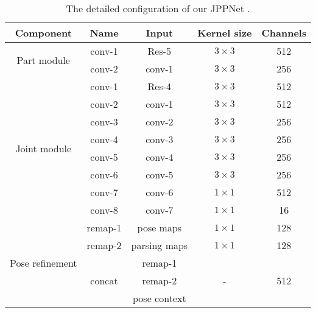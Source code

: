 \documentclass[10pt,journal,compsoc]{IEEEtran}
\begin{document}
\begin{table}[t]
\centering
\scriptsize
\tabcolsep 0.06in 
\caption{The detailed configuration of our JPPNet .}
\vspace{-3mm}
\label{tab: configuration}
\begin{tabular}{ccccc}
\toprule[0.8pt]
   Component                           & Name      & Input         & Kernel size      & Channels \\
\toprule[0.8pt]
   \multirow{2}{*}{Part module}        & conv-1    & Res-5         & $3\times3$       &  512     \\
                                       & conv-2    & conv-1        & $3\times3$       &  256     \\
\toprule[0.8pt]
   \multirow{8}{*}{Joint module}       & conv-1    & Res-4         & $3\times3$       &  512     \\
                                       & conv-2    & conv-1        & $3\times3$       &  512     \\
                                       & conv-3    & conv-2        & $3\times3$       &  256     \\
                                       & conv-4    & conv-3        & $3\times3$       &  256     \\
                                       & conv-5    & conv-4        & $3\times3$       &  256     \\
                                       & conv-6    & conv-5        & $3\times3$       &  256     \\
                                       & conv-7    & conv-6        & $1\times1$       &  512     \\
                                       & conv-8    & conv-7        & $1\times1$       &  16      \\
\toprule[0.8pt]
   \multirow{9}{*}{Pose refinement}    & remap-1   & pose maps     & $1\times1$       &  128     \\
                                       & remap-2   & parsing maps  & $1\times1$       &  128     \\
                                       & \multirow{3}{*}{concat}   & remap-1          & \multirow{3}{*}{-}  & \multirow{3}{*}{512}  \\
                                       &                           & remap-2          &                     &                       \\
                                       &                           & pose context     &                     &                       \\

\end{tabular}
\end{table}
\end{document}

